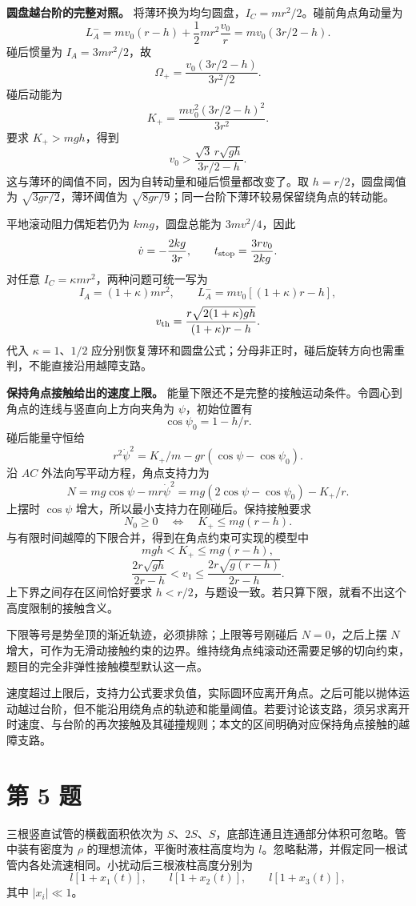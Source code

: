 \documentclass[12pt,a4paper,UTF8]{ctexart}
\begin{document}
\textbf{圆盘越台阶的完整对照。}
将薄环换为均匀圆盘，\(I_C=mr^2/2\)。碰前角点角动量为 \[
L_A^-=mv_0(r-h)+\frac12mr^2\frac{v_0}{r}
=mv_0(3r/2-h).
\] 碰后惯量为 \(I_A=3mr^2/2\)，故 \[
\Omega_+=\frac{v_0(3r/2-h)}{3r^2/2}.
\] 碰后动能为 \[
K_+=\frac{mv_0^2(3r/2-h)^2}{3r^2}.
\] 要求 \(K_+>mgh\)，得到 \[
v_0>\frac{\sqrt3\,r\sqrt{gh}}{3r/2-h}.
\] 这与薄环的阈值不同，因为自转动量和碰后惯量都改变了。取
\(h=r/2\)，圆盘阈值为 \(\sqrt{3gr/2}\)，薄环阈值为
\(\sqrt{8gr/9}\)；同一台阶下薄环较易保留绕角点的转动能。

平地滚动阻力偶矩若仍为 \(kmg\)，圆盘总能为 \(3mv^2/4\)，因此 \[
\dot v=-\frac{2kg}{3r},\qquad
 t_{\rm stop}=\frac{3rv_0}{2kg}.
\] 对任意 \(I_C=\kappa mr^2\)，两种问题可统一写为 \[
I_A=(1+\kappa)mr^2,
\qquad L_A^-=mv_0[(1+\kappa)r-h],
\] \[
v_{\rm th}=\frac{r\sqrt{2(1+\kappa)gh}}{(1+\kappa)r-h}.
\] 代入 \(\kappa=1\)、\(1/2\)
应分别恢复薄环和圆盘公式；分母非正时，碰后旋转方向也需重判，不能直接沿用越障支路。

\textbf{保持角点接触给出的速度上限。}
能量下限还不是完整的接触运动条件。令圆心到角点的连线与竖直向上方向夹角为
\(\psi\)，初始位置有 \[
\cos\psi_0=1-h/r.
\] 碰后能量守恒给 \[
r^2\dot\psi^2=K_+/m-gr(\cos\psi-\cos\psi_0).
\] 沿 \(AC\) 外法向写平动方程，角点支持力为 \[
N=mg\cos\psi-mr\dot\psi^2
=mg(2\cos\psi-\cos\psi_0)-K_+/r.
\] 上摆时 \(\cos\psi\) 增大，所以最小支持力在刚碰后。保持接触要求 \[
N_0\ge0\quad\Longleftrightarrow\quad K_+\le mg(r-h).
\] 与有限时间越障的下限合并，得到在角点约束可实现的模型中 \[
mgh<K_+\le mg(r-h),
\] \[
\frac{2r\sqrt{gh}}{2r-h}<v_1
\le\frac{2r\sqrt{g(r-h)}}{2r-h}.
\] 上下界之间存在区间恰好要求
\(h<r/2\)，与题设一致。若只算下限，就看不出这个高度限制的接触含义。

下限等号是势垒顶的渐近轨迹，必须排除；上限等号刚碰后 \(N=0\)，之后上摆
\(N\)
增大，可作为无滑动接触约束的边界。维持绕角点纯滚动还需要足够的切向约束，题目的完全非弹性接触模型默认这一点。

速度超过上限后，支持力公式要求负值，实际圆环应离开角点。之后可能以抛体运动越过台阶，但不能沿用绕角点的轨迹和能量阈值。若要讨论该支路，须另求离开时速度、与台阶的再次接触及其碰撞规则；本文的区间明确对应保持角点接触的越障支路。

\newpage

\section{第 5 题}\label{ux7b2c-5-ux9898}

三根竖直试管的横截面积依次为
\(S\)、\(2S\)、\(S\)，底部连通且连通部分体积可忽略。管中装有密度为
\(\rho\) 的理想流体，平衡时液柱高度均为
\(l\)。忽略黏滞，并假定同一根试管内各处流速相同。小扰动后三根液柱高度分别为
\[
l[1+x_1(t)],\qquad l[1+x_2(t)],\qquad l[1+x_3(t)],
\] 其中 \(|x_i|\ll1\)。
\end{document}
